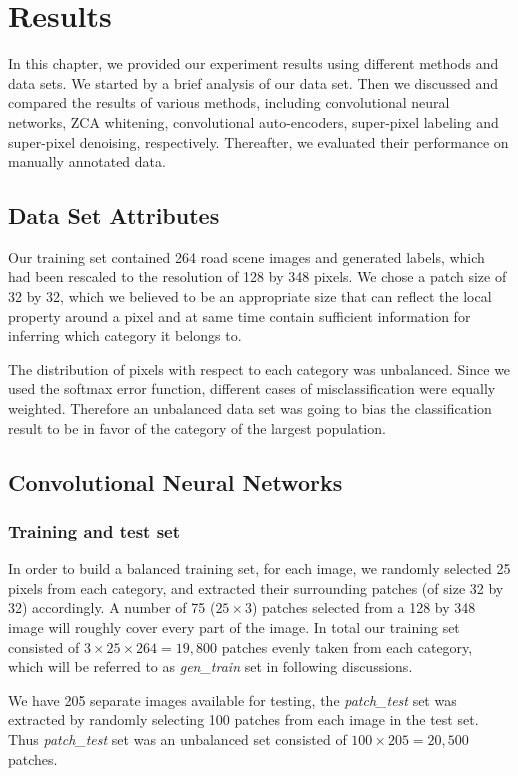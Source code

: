 
\chapter{Results}
\label{cha:Results}
In this chapter, we provided our experiment results using different methods and data sets. We started by a brief analysis of our data set. Then we discussed and compared the results of various methods, including convolutional neural networks, ZCA whitening, convolutional auto-encoders, super-pixel labeling and super-pixel denoising, respectively. Thereafter, we evaluated their performance on manually annotated data. 

\section{Data Set Attributes}
Our training set contained 264 road scene images and generated labels, which had been rescaled to the resolution of 128 by 348 pixels. We chose a patch size of 32 by 32, which we believed to be an appropriate size that can reflect the local property around a pixel and at same time contain sufficient information for inferring which category it belongs to. 

The distribution of pixels with respect to each category was unbalanced. Since we used the softmax error function, different cases of misclassification were equally weighted. Therefore an unbalanced data set was going to bias the classification result to be in favor of the category of the largest population.
\section{Convolutional Neural Networks}
\label{Baseline}
\subsection{Training and test set}
In order to build a balanced training set, for each image, we randomly selected 25 pixels from each category, and extracted their surrounding patches (of size 32 by 32) accordingly. A number of 75 ($25\times3$) patches selected from a 128 by 348 image will roughly cover every part of the image. In total our training set consisted of $3\times25\times264 = 19,800$ patches evenly taken from each category, which will be referred to as \textit{gen\_train} set in following discussions. 

We have 205 separate images available for testing, the \textit{patch\_test} set was extracted by randomly selecting 100 patches from each image in the test set. Thus \textit{patch\_test} set was an unbalanced set consisted of $100\times205 = 20,500$ patches.
